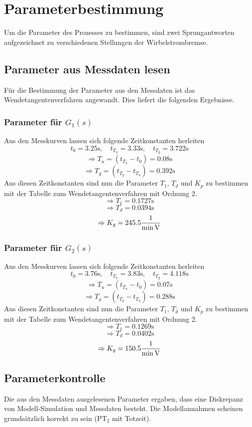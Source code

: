 \section{Parameterbestimmung}
Um die Parameter des Prozesses zu bestimmen, sind zwei Sprungantworten
aufgezeichnet zu verschiedenen Stellungen der Wirbelstrombremse.

\subsection{Parameter aus Messdaten lesen}
Für die Bestimmung der Parameter aus den Messdaten ist das
Wendetangentenverfahren angewandt. Dies liefert die folgenden 
Ergebnisse.

\subsubsection{Parameter für $G_1(s)$}
Aus den Messkurven lassen sich folgende Zeitkonstanten herleiten
\[
	t_0 = 3.25\si{\second},
	\quad t_{T_u} = 3.33\si{\second},
	\quad t_{T_g} = 3.722\si{\second}
\]
\[ \Rightarrow T_u = (t_{T_u} - t_0) = 0.08\si{\second} \]
\[ \Rightarrow T_g = (t_{T_g} - t_{T_u}) = 0.392\si{\second} \]
Aus diesen Zeitkonstanten sind nun die Parameter $T_1$, $T_d$ und $K_p$
zu bestimmen mit der Tabelle zum Wendetangentenverfahren mit Ordnung 2.
\[ \Rightarrow T_1 = 0.1727\si{\second} \]
\[ \Rightarrow T_d = 0.0394\si{\second} \]
\[ \Rightarrow K_g = 245.5\si[per-mode=fraction]{\per\minute\per\volt} \]

\subsubsection{Parameter für $G_2(s)$}
Aus den Messkurven lassen sich folgende Zeitkonstanten herleiten
\[
	t_0 = 3.76\si{\second},
	\quad t_{T_u} = 3.83\si{\second},
	\quad t_{T_g} = 4.118\si{\second}
\]
\[ \Rightarrow T_u = (t_{T_u} - t_0) = 0.07\si{\second} \]
\[ \Rightarrow T_g = (t_{T_g} - t_{T_u}) = 0.288\si{\second} \]
Aus diesen Zeitkonstanten sind nun die Parameter $T_1$, $T_d$ und $K_p$
zu bestimmen mit der Tabelle zum Wendetangentenverfahren mit Ordnung 2.
\[ \Rightarrow T_1 = 0.1269\si{\second} \]
\[ \Rightarrow T_d = 0.0402\si{\second} \]
\[ \Rightarrow K_g = 150.5\si[per-mode=fraction]{\per\minute\per\volt} \]

\subsection{Parameterkontrolle}
Die aus den Messdaten ausgelesenen Parameter ergaben, dass eine Diskrepanz
von Modell-Simulation und Messdaten besteht. Die Modellannahmen scheinen
grundsätzlich korrekt zu sein (PT$_2$ mit Totzeit).

